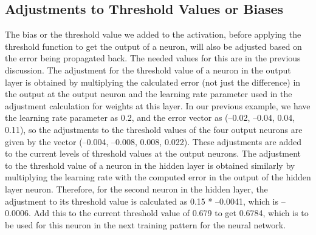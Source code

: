 \documentclass[12pt, right open]{memoir}
\begin{document}
\subsection{Adjustments to Threshold Values or Biases}
The bias or the threshold value we added to the activation, before applying the
threshold function to get the output of a neuron, will also be adjusted based on
the error being propagated back. The needed values for this are in the previous
discussion.
The adjustment for the threshold value of a neuron in the output layer is
obtained by multiplying the calculated error (not just the difference) in the
output at the output neuron and the learning rate parameter used in the
adjustment calculation for weights at this layer. In our previous example, we
have the learning rate parameter as 0.2, and the error vector as (–0.02, –0.04,
0.04, 0.11), so the adjustments to the threshold values of the four output
neurons are given by the vector (–0.004, –0.008, 0.008, 0.022). These
adjustments are added to the current levels of threshold values at the output
neurons.
The adjustment to the threshold value of a neuron in the hidden layer is
obtained similarly by multiplying the learning rate with the computed error in
the output of the hidden layer neuron. Therefore, for the second neuron in the
hidden layer, the adjustment to its threshold value is calculated as 0.15 *
–0.0041, which is –0.0006. Add this to the current threshold value of 0.679 to
get 0.6784, which is to be used for this neuron in the next training pattern for
the neural network.
\end{document}
